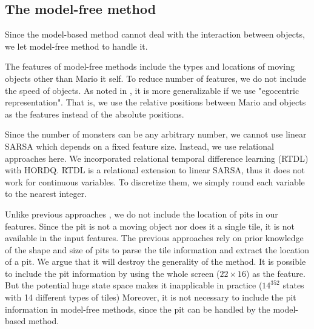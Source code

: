 



\subsection{The model-free method}

Since the model-based method cannot deal with the interaction between objects, we let
model-free method to handle it.

The features of model-free methods include the types and locations of moving objects
other than Mario it self. To reduce number of features, we do not include the speed of objects.
As noted in \cite{Gibson09}, it is more generalizable if we use "egocentric representation".
That is, we use the relative positions between Mario and objects 
as the features instead of the absolute positions.

Since the number of monsters can be any arbitrary number, 
we cannot use linear SARSA which depends on a fixed feature size.
Instead, we use relational approaches here. 
We incorporated relational temporal difference learning (RTDL) \cite{RRLTD}
with HORDQ. RTDL is a relational extension to linear SARSA, thus it does not
work for continuous variables. To discretize them, we simply
round each variable to the nearest integer. 

Unlike previous approaches \cite{Paul09, Gibson09, Mohan09, Mohan10},
we do not include the location of pits in our features.
Since the pit is not a moving object nor does it a single tile,
it is not available in the input features.
The previous approaches rely on prior knowledge of the shape and size of pits to parse the tile information
and extract the location of a pit. 
We argue that it will destroy the generality of the method.
It is possible to include the pit information by using the whole screen ($22 \times 16$)
as the feature. But the potential huge state space makes it inapplicable in practice ($14^{352}$ states with 14 different types of tiles)
Moreover, it is not necessary to include the pit information in model-free methods,
since the pit can be handled by the model-based method. 

